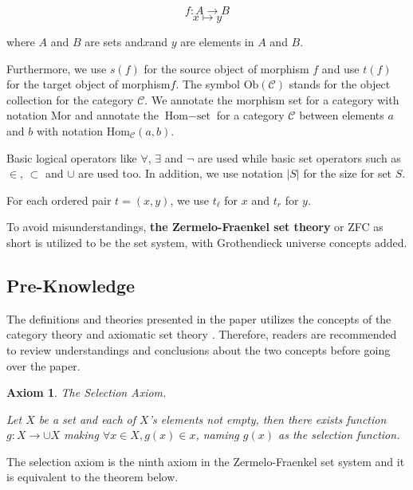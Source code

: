 \documentclass{aims}
\newtheorem{axiom}{Axiom}	%
\numberwithin{theorem}{section}	%
\numberwithin{axiom}{section}	%
\numberwithin{definition}{section}	%
\begin{document}
\begin{equation*}
	f: A \to B
\end{equation*}
\begin{equation*}
	x\mapsto y
\end{equation*}

\noindent where \(A\) and \(B\) are sets and\(x\)and \(y\) are elements in \(A\) and \(B\).

 Furthermore, we use \(s(f)\) for the source object of morphism \(f\)\textit{  }and use \(t(f)\) for the target object of morphism\(f\). The symbol \(\text{Ob}(\mathcal{C})\) stands for the object collection for the category \(\mathcal{C}\). We annotate the morphism set for a category with notation \(\text{Mor}\) and annotate the \(\text{Hom}-\text{set}\) for a category \(\mathcal{C}\) between elements \(a\) and \(b\) with notation \(\text{Hom}_{\mathcal{C}}(a,b)\).

Basic logical operators like \(\forall\), \(\exists\) and \(\neg\) are used while basic set operators such as \(\in\), \(\subset\) and \(\cup\) are used too. In addition, we use notation \(|S|\) for the size for set \(S\).

For each ordered pair \(t=(x,y)\), we use \(t_{\ell }\) for \(x\) and \(t_{\mathit{r}}\) for \(y\).

To avoid misunderstandings, \textbf{the Zermelo-Fraenkel set theory} or ZFC as short is utilized to be the set system, with Grothendieck universe concepts added. \cite{Li2019}

\subsection{Pre-Knowledge}

The definitions and theories presented in the paper utilizes the concepts of the category theory \cite{Li2019} and axiomatic set theory \cite{Li2019}. Therefore, readers are recommended to review understandings and conclusions about the two concepts before going over the paper.

\begin{axiom}
	The Selection Axiom.
	
	Let \(X\) be a set and each of \(X\){'}s elements not empty, then there exists function \(g:X\to \cup X\) making \(\forall x\in X,g(x)\in x\), naming \(g(x)\) as the selection function.
\end{axiom}

The selection axiom is the ninth axiom in the Zermelo-Fraenkel set system and it is equivalent to the theorem below.
\end{document}
